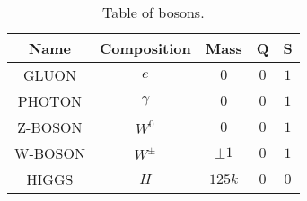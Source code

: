 \documentclass{article}
\begin{document}
\begin{table}[h!]
    \centering
    \begin{tabular}{||c c c c c||} 
     \hline
     Name & Composition & Mass & Q & S \\ [0.5ex] 
     \hline\hline
     GLUON & $e$ & $0$ & $0$ & $1$ \\[1ex] 
     PHOTON & $\gamma$ & $0$ & $0$ & $1$ \\[1ex]
     Z-BOSON & $W^0$ & $0$ & $0$ & $1$ \\[1ex]
     W-BOSON & $W^\pm$ & $\pm 1$ & $0$ & $1$ \\[1ex]
     HIGGS & $H$ & $125k$ & $0$ & $0$ \\[1ex]
     \hline
    \end{tabular}
    \caption{Table of bosons.}
    \label{table:bosons}
\end{table}
\end{document}
